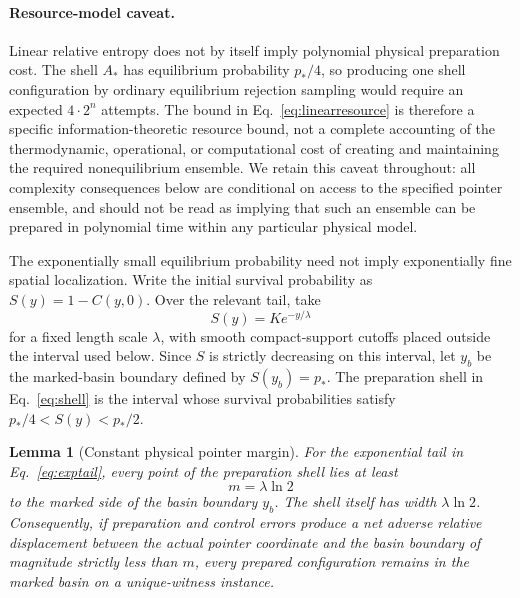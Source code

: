 \documentclass[pdflatex,sn-mathphys-num]{sn-jnl}
\theoremstyle{thmstyleone}
\newtheorem{lemma}{Lemma}
\begin{document}
\paragraph{Resource-model caveat.}
\label{par:resourcecaveat}
Linear relative entropy does not by itself imply polynomial physical preparation cost. The shell $A_*$ has equilibrium probability $p_*/4$, so producing one shell configuration by ordinary equilibrium rejection sampling would require an expected $4\cdot 2^n$ attempts. The bound in Eq.~\eqref{eq:linearresource} is therefore a specific information-theoretic resource bound, not a complete accounting of the thermodynamic, operational, or computational cost of creating and maintaining the required nonequilibrium ensemble. We retain this caveat throughout: all complexity consequences below are conditional on access to the specified pointer ensemble, and should not be read as implying that such an ensemble can be prepared in polynomial time within any particular physical model.

The exponentially small equilibrium probability need not imply exponentially fine spatial localization. Write the initial survival probability as $S(y)=1-C(y,0)$. Over the relevant tail, take
\begin{equation}
S(y)=K e^{-y/\lambda}
\label{eq:exptail}
\end{equation}
for a fixed length scale $\lambda$, with smooth compact-support cutoffs placed outside the interval used below. Since $S$ is strictly decreasing on this interval, let $y_b$ be the marked-basin boundary defined by $S(y_b)=p_*$. The preparation shell in Eq.~\eqref{eq:shell} is the interval whose survival probabilities satisfy $p_*/4<S(y)<p_*/2$.

\begin{lemma}[Constant physical pointer margin]
\label{lem:pointermargin}
For the exponential tail in Eq.~\eqref{eq:exptail}, every point of the preparation shell lies at least
\begin{equation}
m=\lambda\ln2
\label{eq:pointermargin}
\end{equation}
to the marked side of the basin boundary $y_b$. The shell itself has width $\lambda\ln2$. Consequently, if preparation and control errors produce a net adverse relative displacement between the actual pointer coordinate and the basin boundary of magnitude strictly less than $m$, every prepared configuration remains in the marked basin on a unique-witness instance.
\end{lemma}
\end{document}
